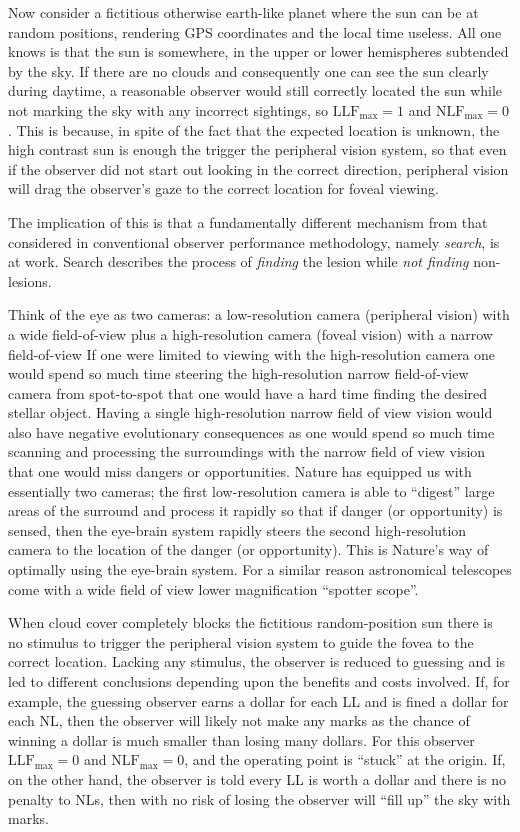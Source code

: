 \documentclass[
]{book}
\begin{document}
Now consider a fictitious otherwise earth-like planet where the sun can be at random positions, rendering GPS coordinates and the local time useless. All one knows is that the sun is somewhere, in the upper or lower hemispheres subtended by the sky. If there are no clouds and consequently one can see the sun clearly during daytime, a reasonable observer would still correctly located the sun while not marking the sky with any incorrect sightings, so \(\text{LLF}_{\text{max}} = 1\) and \(\text{NLF}_{\text{max}} = 0\). This is because, in spite of the fact that the expected location is unknown, the high contrast sun is enough the trigger the peripheral vision system, so that even if the observer did not start out looking in the correct direction, peripheral vision will drag the observer's gaze to the correct location for foveal viewing.

The implication of this is that a fundamentally different mechanism from that considered in conventional observer performance methodology, namely \emph{search}, is at work. Search describes the process of \emph{finding} the lesion while \emph{not finding} non-lesions.

Think of the eye as two cameras: a low-resolution camera (peripheral vision) with a wide field-of-view plus a high-resolution camera (foveal vision) with a narrow field-of-view If one were limited to viewing with the high-resolution camera one would spend so much time steering the high-resolution narrow field-of-view camera from spot-to-spot that one would have a hard time finding the desired stellar object. Having a single high-resolution narrow field of view vision would also have negative evolutionary consequences as one would spend so much time scanning and processing the surroundings with the narrow field of view vision that one would miss dangers or opportunities. Nature has equipped us with essentially two cameras; the first low-resolution camera is able to ``digest'' large areas of the surround and process it rapidly so that if danger (or opportunity) is sensed, then the eye-brain system rapidly steers the second high-resolution camera to the location of the danger (or opportunity). This is Nature's way of optimally using the eye-brain system. For a similar reason astronomical telescopes come with a wide field of view lower magnification ``spotter scope''.

When cloud cover completely blocks the fictitious random-position sun there is no stimulus to trigger the peripheral vision system to guide the fovea to the correct location. Lacking any stimulus, the observer is reduced to guessing and is led to different conclusions depending upon the benefits and costs involved. If, for example, the guessing observer earns a dollar for each LL and is fined a dollar for each NL, then the observer will likely not make any marks as the chance of winning a dollar is much smaller than losing many dollars. For this observer \(\text{LLF}_{\text{max}} = 0\) and \(\text{NLF}_{\text{max}} = 0\), and the operating point is ``stuck'' at the origin. If, on the other hand, the observer is told every LL is worth a dollar and there is no penalty to NLs, then with no risk of losing the observer will ``fill up'' the sky with marks.
\end{document}
